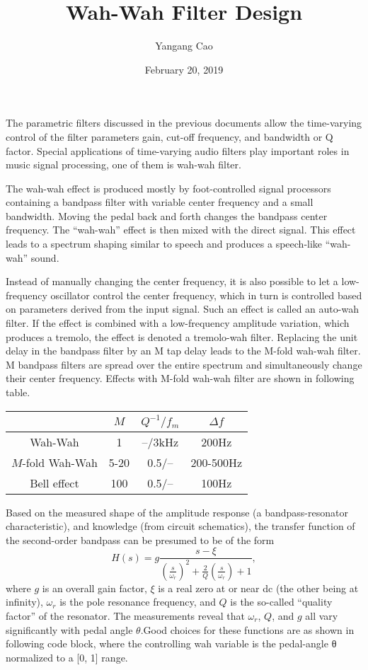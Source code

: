 \documentclass[10pt,a4paper,oneside]{article}
\author{Yangang Cao}
\date{February 20, 2019}
\begin{document}
\title{Wah-Wah Filter Design}
\maketitle 
The parametric filters discussed in the previous documents allow the time-varying control of the filter parameters gain, cut-off frequency, and bandwidth or Q factor. Special applications of time-varying audio filters play important roles in music signal processing, one of them is wah-wah filter.

The wah-wah effect is produced mostly by foot-controlled signal processors containing a bandpass filter with variable center frequency and a small bandwidth. Moving the pedal back and forth changes the bandpass center frequency. The “wah-wah” effect is then mixed with the direct signal. This effect leads to a spectrum shaping similar to speech and produces a speech-like “wah-wah” sound. 

Instead of manually changing the center frequency, it is also possible to let a low-frequency oscillator control the center frequency, which in turn is controlled based on parameters derived from the input signal. Such an effect is called an auto-wah filter. If the effect is combined with a low-frequency amplitude variation, which produces a tremolo, the effect is denoted a tremolo-wah filter. Replacing the unit delay in the bandpass filter by an M tap delay leads to the M-fold wah-wah filter. M bandpass filters are spread over the entire spectrum and simultaneously change their center frequency. Effects with M-fold wah-wah filter are shown in following table.
\begin{center}
	\begin{tabular}{cccc}
		\toprule  %
		& {$M$}&{$Q^{-1}/f_m$}&{$\Delta f$}\\
		\midrule  %
		Wah-Wah&1& --/3kHz & 200Hz\\
		$M$-fold Wah-Wah& 5-20 & 0.5/-- & 200-500Hz\\
		Bell effect&100&0.5/--&100Hz\\
		\bottomrule %
	\end{tabular}
\end{center}
Based on the measured shape of the amplitude response (a bandpass-resonator characteristic), and knowledge (from circuit schematics), the transfer function of the second-order bandpass can be presumed to be of the form
\[
H(s) = g\frac{s-\xi}{\left(\frac{s}{\omega_r}\right)^2+\frac{2}{Q}\left(\frac{s}{\omega_r}\right)+1},
\]
where $g$ is an overall gain factor, $\xi$ is a real zero at or near dc (the other being at infinity), $\omega_r$ is the pole resonance frequency, and $Q$ is the so-called “quality factor” of the resonator. The measurements reveal that $\omega_r$, $Q$, and $g$ all vary significantly with pedal angle $\theta$.Good choices for these functions are as shown in following code block, where the controlling wah variable is the pedal-angle θ normalized to a [0, 1] range.
\end{document}
